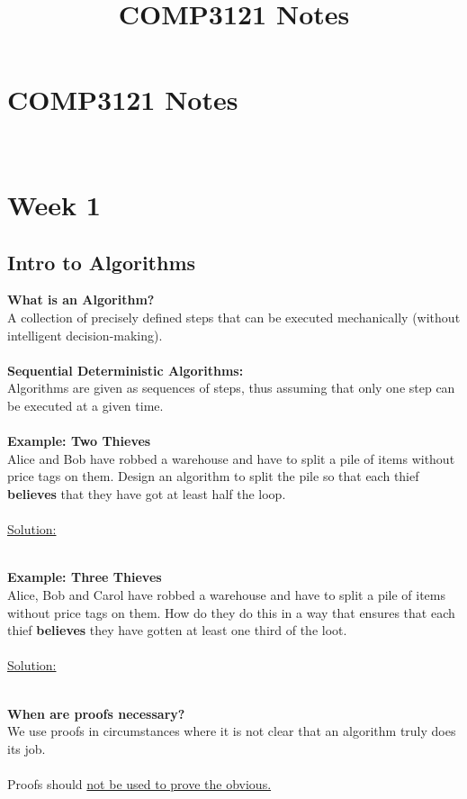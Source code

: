 \documentclass{article}
\title{COMP3121 Notes}
\begin{document}
\section*{\huge COMP3121 Notes}
~\\
\section{Week 1}
\subsection{Intro to Algorithms}

\textbf{What is an Algorithm?} \\
A collection of precisely defined steps that can be executed mechanically (without intelligent decision-making).
\\\\
\textbf{Sequential Deterministic Algorithms:} \\
Algorithms are given as sequences of steps, thus assuming that only one step can be executed at a given time.
\\\\
\textbf{Example: Two Thieves} \\
Alice and Bob have robbed a warehouse and have to split a pile of items without price tags on them. 
Design an algorithm to split the pile so that each thief \textbf{believes} that they have got at least
half the loop.
\\\\
\underline{Solution:} \\
\begin{algorithmic}
\end{algorithmic}
~\\
\textbf{Example: Three Thieves} \\
Alice, Bob and Carol have robbed a warehouse and have to split a pile of items without price tags on them. How do they do this in a way that ensures that each thief \textbf{believes} they have gotten at least one third of the loot.
\\\\
\underline{Solution:} \\
\begin{algorithmic} 
        \ENDIF
    \ENDIF
\end{algorithmic}
~\\
\textbf{When are proofs necessary?} \\
We use proofs in circumstances where it is not clear that an algorithm truly does its job. \\\\
Proofs should \underline{not be used to prove the obvious.}
\pagebreak
\end{document}
